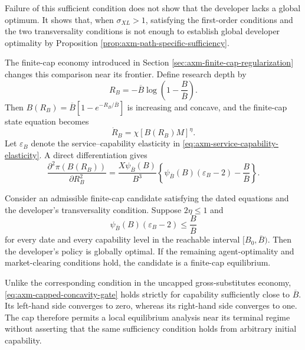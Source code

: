Failure of this sufficient condition does not show that the developer lacks a
global optimum. It shows that, when \(\sigma_{XL}>1\), satisfying the first-order
conditions and the two transversality conditions is not enough to establish
global developer optimality by Proposition
\ref{prop:axm-path-specific-sufficiency}.

The finite-cap economy introduced in Section
\ref{sec:axm-finite-cap-regularization} changes this comparison near its
frontier. Define research depth by
\begin{equation}
 R_B=-\overline B\log\left(1-\frac{B}{\overline B}\right).
 \label{eq:axm-research-depth}
\end{equation}
Then \(B(R_B)=\overline B[1-e^{-R_B/\overline B}]\) is increasing and concave,
and the finite-cap state equation becomes
\begin{equation}
 \dot R_B=\chi[B(R_B)M]^\eta.
 \label{eq:axm-research-depth-law}
\end{equation}
Let \(\varepsilon_B\) denote the service--capability elasticity in
\eqref{eq:axm-service-capability-elasticity}. A direct differentiation gives
\begin{equation}
 \frac{\partial^2\pi(B(R_B))}{\partial R_B^2}
 =\frac{X\psi_{\overline B}(B)}{B^3}
 \left\{
  \psi_{\overline B}(B)(\varepsilon_B-2)
  -\frac{B}{\overline B}
 \right\}.
 \label{eq:axm-capped-profit-curvature}
\end{equation}

\begin{proposition}
\label{prop:axm-capped-developer-sufficiency}
Consider an admissible finite-cap candidate satisfying the dated equations and
the developer's transversality condition. Suppose \(2\eta\leq1\) and
\begin{equation}
 \psi_{\overline B}(B)(\varepsilon_B-2)
 \leq\frac{B}{\overline B}
 \label{eq:axm-capped-concavity-gate}
\end{equation}
for every date and every capability level in the reachable interval
\([B_0,\overline B)\). Then the developer's policy is globally optimal. If the
remaining agent-optimality and market-clearing conditions hold, the candidate
is a finite-cap equilibrium.
\end{proposition}

Unlike the corresponding condition in the uncapped gross-substitutes economy,
\eqref{eq:axm-capped-concavity-gate} holds strictly for capability sufficiently
close to \(\overline B\). Its left-hand side converges to zero, whereas its
right-hand side converges to one. The cap therefore permits a local equilibrium
analysis near its terminal regime without asserting that the same sufficiency
condition holds from arbitrary initial capability.

